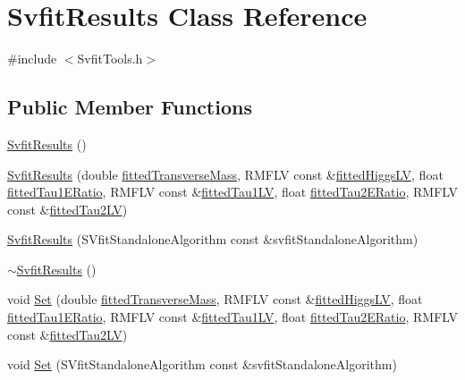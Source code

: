 \hypertarget{classSvfitResults}{
\section{SvfitResults Class Reference}
\label{classSvfitResults}
}


{\ttfamily \#include $<$SvfitTools.h$>$}\subsection*{Public Member Functions}
\begin{DoxyCompactItemize}
\item 
\hyperlink{classSvfitResults_aacb68d5010cb4ca046f01d846c074fe7}{SvfitResults} ()
\item 
\hyperlink{classSvfitResults_a8331554fc6ab67e2a2856c61f8b2286a}{SvfitResults} (double \hyperlink{classSvfitResults_a0da3be281513b44ba678f0402b0bdf1d}{fittedTransverseMass}, RMFLV const \&\hyperlink{classSvfitResults_ad53212bbbb3ed120e696fe36fa4ad215}{fittedHiggsLV}, float \hyperlink{classSvfitResults_a061a9d939fb96f6cdfc0688a7b3db356}{fittedTau1ERatio}, RMFLV const \&\hyperlink{classSvfitResults_a122d035561c86eff8aa24f84e0c67cb2}{fittedTau1LV}, float \hyperlink{classSvfitResults_a94a0917e8fac0662ad460800b77aa71e}{fittedTau2ERatio}, RMFLV const \&\hyperlink{classSvfitResults_ad1b5371d1ebf4c5cc04c029f280a46cb}{fittedTau2LV})
\item 
\hyperlink{classSvfitResults_a949205ecda5ead5d8e5bce308e2a9880}{SvfitResults} (SVfitStandaloneAlgorithm const \&svfitStandaloneAlgorithm)
\item 
\hyperlink{classSvfitResults_a5b9bcbf6a71d304d800ff5951a023d07}{$\sim$SvfitResults} ()
\item 
void \hyperlink{classSvfitResults_abc44ddb612f169968a7c53e254d15579}{Set} (double \hyperlink{classSvfitResults_a0da3be281513b44ba678f0402b0bdf1d}{fittedTransverseMass}, RMFLV const \&\hyperlink{classSvfitResults_ad53212bbbb3ed120e696fe36fa4ad215}{fittedHiggsLV}, float \hyperlink{classSvfitResults_a061a9d939fb96f6cdfc0688a7b3db356}{fittedTau1ERatio}, RMFLV const \&\hyperlink{classSvfitResults_a122d035561c86eff8aa24f84e0c67cb2}{fittedTau1LV}, float \hyperlink{classSvfitResults_a94a0917e8fac0662ad460800b77aa71e}{fittedTau2ERatio}, RMFLV const \&\hyperlink{classSvfitResults_ad1b5371d1ebf4c5cc04c029f280a46cb}{fittedTau2LV})
\item 
void \hyperlink{classSvfitResults_a65bd60c67619a8833287c6f86687cc27}{Set} (SVfitStandaloneAlgorithm const \&svfitStandaloneAlgorithm)

\end{DoxyCompactItemize}
